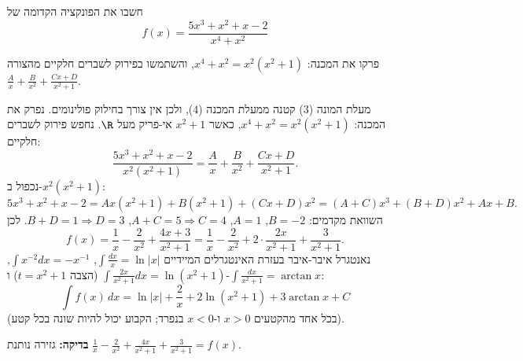 
\begin{question}
חשבו את הפונקציה הקדומה של
\[ f(x)=\frac{5x^3+x^2+x-2}{x^4+x^2} \]
\end{question}

\begin{hint}
פרקו את המכנה: $x^4+x^2=x^2(x^2+1)$, והשתמשו בפירוק לשברים חלקיים מהצורה $\frac Ax+\frac B{x^2}+\frac{Cx+D}{x^2+1}$.
\end{hint}

\begin{solution}
מעלת המונה ($3$) קטנה ממעלת המכנה ($4$), ולכן אין צורך בחילוק פולינומים. נפרק את המכנה: $x^4+x^2=x^2(x^2+1)$, כאשר $x^2+1$ אי-פריק מעל $\R$. נחפש פירוק לשברים חלקיים:
\[ \frac{5x^3+x^2+x-2}{x^2(x^2+1)}=\frac Ax+\frac B{x^2}+\frac{Cx+D}{x^2+1}. \]
נכפול ב-$x^2(x^2+1)$:
\[ 5x^3+x^2+x-2=Ax(x^2+1)+B(x^2+1)+(Cx+D)x^2=(A+C)x^3+(B+D)x^2+Ax+B. \]
השוואת מקדמים: $B=-2$, $A=1$, $A+C=5\Rightarrow C=4$, $B+D=1\Rightarrow D=3$. לכן
\[ f(x)=\frac1x-\frac2{x^2}+\frac{4x+3}{x^2+1}=\frac1x-\frac2{x^2}+2\cdot\frac{2x}{x^2+1}+\frac{3}{x^2+1}. \]
נאנטגרל איבר-איבר בעזרת האינטגרלים המיידיים $\int\frac{dx}x=\ln|x|$, $\int x^{-2}dx=-x^{-1}$, $\int\frac{2x}{x^2+1}dx=\ln(x^2+1)$ (הצבה $t=x^2+1$) ו-$\int\frac{dx}{x^2+1}=\arctan x$:
\[ \boxed{\int f(x)\,dx=\ln|x|+\frac2x+2\ln(x^2+1)+3\arctan x+C} \]
(בכל אחד מהקטעים $x>0$ ו-$x<0$ בנפרד; הקבוע יכול להיות שונה בכל קטע).

\textbf{בדיקה:} גזירה נותנת $\frac1x-\frac2{x^2}+\frac{4x}{x^2+1}+\frac3{x^2+1}=f(x)$.
\end{solution}
